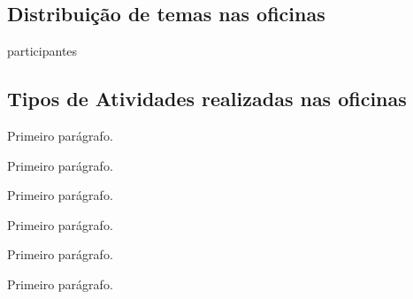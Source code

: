 \documentclass[
12pt,		%
openright,	%
twoside,  %
a4paper,			%
chapter=TITLE,		%
english,			%
french,				%
spanish,			%
brazil				%
]{USPSC-classe/USPSC}
\begin{document}
\subsection[Distribui\c{c}\~ao de temas nas oficinas]{Distribui\c{c}\~ao de temas nas oficinas}\label{Distribui\c{c}\~ao de temas nas oficinas}
participantes














\subsection[Tipos de Atividades realizadas nas oficinas]{Tipos de Atividades realizadas nas oficinas}\label{Tipos de Atividades realizadas nas oficinas}
Primeiro par\'agrafo.














Primeiro par\'agrafo.














Primeiro par\'agrafo.














Primeiro par\'agrafo.














Primeiro par\'agrafo.














Primeiro par\'agrafo.
\end{document}
